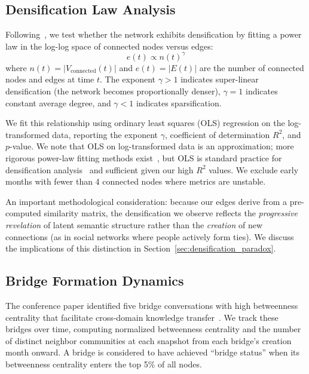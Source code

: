\documentclass[10pt,letterpaper]{article}
\begin{document}
\subsection{Densification Law Analysis}
\label{sec:densification}

Following~\citet{leskovec2005graphs}, we test whether the network exhibits densification by fitting a power law in the log-log space of connected nodes versus edges:
\begin{equation}
  e(t) \propto n(t)^\gamma
  \label{eq:densification}
\end{equation}
where $n(t) = |V_{\text{connected}}(t)|$ and $e(t) = |E(t)|$ are the number of connected nodes and edges at time $t$. The exponent $\gamma > 1$ indicates super-linear densification (the network becomes proportionally denser), $\gamma = 1$ indicates constant average degree, and $\gamma < 1$ indicates sparsification.

We fit this relationship using ordinary least squares (OLS) regression on the log-transformed data, reporting the exponent $\gamma$, coefficient of determination $R^2$, and $p$-value. We note that OLS on log-transformed data is an approximation; more rigorous power-law fitting methods exist~\citep{clauset2009power}, but OLS is standard practice for densification analysis~\citep{leskovec2007graph} and sufficient given our high $R^2$ values. We exclude early months with fewer than 4 connected nodes where metrics are unstable.

An important methodological consideration: because our edges derive from a pre-computed similarity matrix, the densification we observe reflects the \emph{progressive revelation} of latent semantic structure rather than the \emph{creation} of new connections (as in social networks where people actively form ties). We discuss the implications of this distinction in Section~\ref{sec:densification_paradox}.

\subsection{Bridge Formation Dynamics}
\label{sec:bridge_dynamics}

The conference paper identified five bridge conversations with high betweenness centrality that facilitate cross-domain knowledge transfer~\citep{towell2025cognitive}. We track these bridges over time, computing normalized betweenness centrality and the number of distinct neighbor communities at each snapshot from each bridge's creation month onward. A bridge is considered to have achieved ``bridge status'' when its betweenness centrality enters the top 5\% of all nodes.
\end{document}
